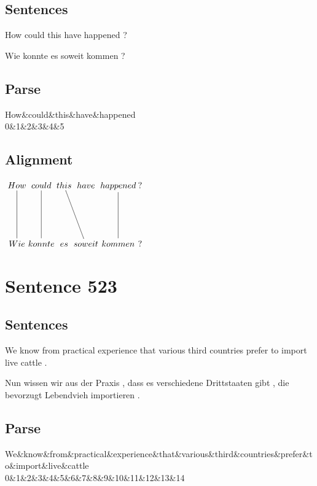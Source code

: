 \documentclass{report}
\begin{document}
\subsection*{Sentences}
How could this have happened ?

\noindent Wie konnte es soweit kommen ?



\subsection*{Parse}
\begin{dependency}[theme=simple]
\begin{deptext}[column sep=.5cm, row sep=.1ex]
How\&could\&this\&have\&happened\\
0\&1\&2\&3\&4\&5\\
\end{deptext}
\end{dependency}


\subsection*{Alignment}
\scriptsize{
$
\xymatrix@C-2.3pc{
How \ar @{-} [dd] & could \ar @{-} [dd] & this \ar @{-} [ddr] & have & happened \ar @{-} [dd] & ?\\\\
Wie & konnte & es & soweit & kommen & ?
}$}
\newpage\section*{Sentence 523}

\subsection*{Sentences}
We know from practical experience that various third countries prefer to import live cattle .

\noindent Nun wissen wir aus der Praxis , dass es verschiedene Drittstaaten gibt , die bevorzugt Lebendvieh importieren .



\subsection*{Parse}
\begin{dependency}[theme=simple]
\begin{deptext}[column sep=.5cm, row sep=.1ex]
We\&know\&from\&practical\&experience\&that\&various\&third\&countries\&prefer\&to\&import\&live\&cattle\\
0\&1\&2\&3\&4\&5\&6\&7\&8\&9\&10\&11\&12\&13\&14\\
\end{deptext}
\end{dependency}
\end{document}
